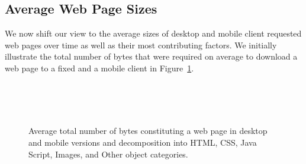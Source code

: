 \documentclass[onecolumn,12pt]{IEEEtran}
\begin{document}
\subsection{Average Web Page Sizes}
\label{ss:bytes}
We now shift our view to the average sizes of desktop and mobile client requested web pages over time as well as their most contributing factors.
We initially illustrate the total number of bytes that were required on average to download a web page to a fixed and a mobile client in Figure~\ref{fig:sizes}.
\begin{figure}
	\centering
	\\
	\\
	\\
	\caption{Average total number of bytes constituting a web page in desktop and mobile versions and decomposition into  HTML, CSS, Java Script, Images, and Other object categories.\label{fig:sizes}}
\end{figure}
\end{document}
